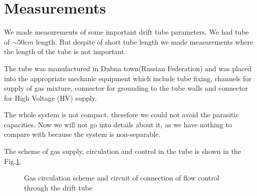 \section{Measurements} 
	\label{sec:Mesurements}	
	
	We made measurements of some important drift tube parameters. We had tube of $\sim 50cm$ length. But despite of short tube length we made measurements where the length of the tube is not important.
	
	The tube was manufactured in Dubna town(Russian Federation) and was placed into the appropriate  mechanic equipment which include tube fixing, channels for supply of gas mixture, connector for grounding to the tube walls and connector for High Voltage (HV) supply.
	
	The whole system is not compact, therefore we could not avoid the parasitic capacities. Now we will not go into details about it, as we have nothing to compare with because the system is non-separable.

	The scheme of gas supply, circulation and control in the tube is shown in the Fig.\ref{fig:gasFlowScheme}.
	
	\begin{figure}[!h]
	\centering
	\caption{Gas circulation scheme and circuit of connection of flow control through the drift tube}
	\label{fig:gasFlowScheme}
	\end{figure}		
	
